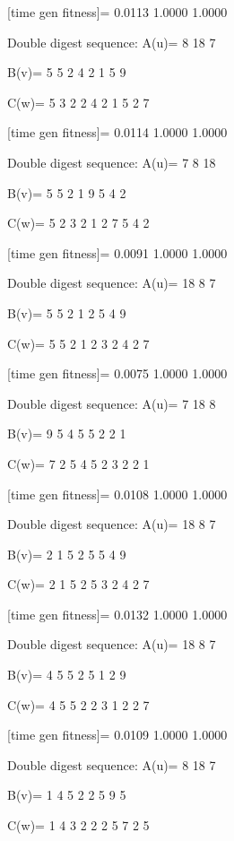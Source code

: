 [time gen fitness]=
    0.0113    1.0000    1.0000

Double digest sequence:
A(u)=
     8    18     7

B(v)=
     5     5     2     4     2     1     5     9

C(w)=
     5     3     2     2     4     2     1     5     2     7

[time gen fitness]=
    0.0114    1.0000    1.0000

Double digest sequence:
A(u)=
     7     8    18

B(v)=
     5     5     2     1     9     5     4     2

C(w)=
     5     2     3     2     1     2     7     5     4     2

[time gen fitness]=
    0.0091    1.0000    1.0000

Double digest sequence:
A(u)=
    18     8     7

B(v)=
     5     5     2     1     2     5     4     9

C(w)=
     5     5     2     1     2     3     2     4     2     7

[time gen fitness]=
    0.0075    1.0000    1.0000

Double digest sequence:
A(u)=
     7    18     8

B(v)=
     9     5     4     5     5     2     2     1

C(w)=
     7     2     5     4     5     2     3     2     2     1

[time gen fitness]=
    0.0108    1.0000    1.0000

Double digest sequence:
A(u)=
    18     8     7

B(v)=
     2     1     5     2     5     5     4     9

C(w)=
     2     1     5     2     5     3     2     4     2     7

[time gen fitness]=
    0.0132    1.0000    1.0000

Double digest sequence:
A(u)=
    18     8     7

B(v)=
     4     5     5     2     5     1     2     9

C(w)=
     4     5     5     2     2     3     1     2     2     7

[time gen fitness]=
    0.0109    1.0000    1.0000

Double digest sequence:
A(u)=
     8    18     7

B(v)=
     1     4     5     2     2     5     9     5

C(w)=
     1     4     3     2     2     2     5     7     2     5

